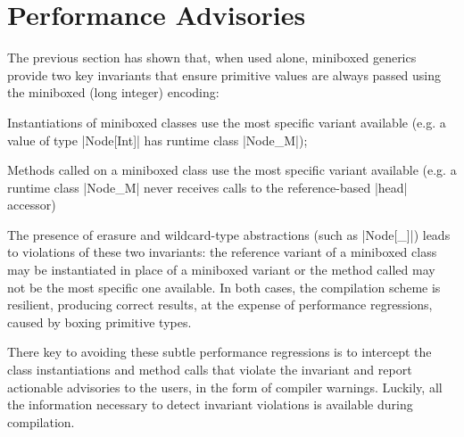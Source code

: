 \vspace{-0.7em}
\section{Performance Advisories}
\label{sec:advisories}

\vspace{-0.2em}

The previous section has shown that, when used alone, miniboxed generics provide two key invariants that ensure primitive values are always passed using the miniboxed (long integer) encoding:

\begin{compactitem}
\item Instantiations of miniboxed classes use the most specific variant available (e.g. a value of type |Node[Int]| has runtime class |Node_M|);
\item Methods called on a miniboxed class use the most specific variant available (e.g. a runtime class |Node_M| never receives calls to the reference-based |head| accessor)
\end{compactitem}

The presence of erasure and wildcard-type abstractions (such as |Node[_]|) leads to violations of these two invariants: the reference variant of a miniboxed class may be instantiated in place of a miniboxed variant or the method called may not be the most specific one available. In both cases, the compilation scheme is resilient, producing correct results, at the expense of performance regressions, caused by boxing primitive types.

There key to avoiding these subtle performance regressions is to intercept the class instantiations and method calls that violate the invariant and report actionable advisories to the users, in the form of compiler warnings. Luckily, all the information necessary to detect invariant violations is available during compilation.



